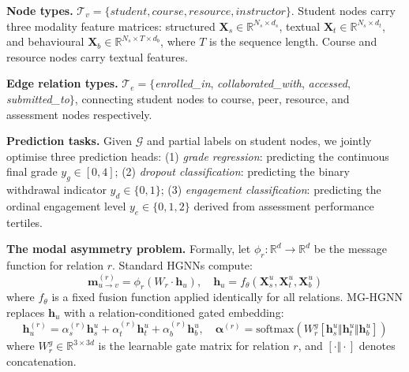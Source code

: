 \documentclass[sigconf]{acmart}
\begin{document}
\textbf{Node types.}
$\mathcal{T}_v = \{\textit{student}, \textit{course},
\textit{resource}, \textit{instructor}\}$.
Student nodes carry three modality feature matrices:
structured $\mathbf{X}_s \in \mathbb{R}^{N_s \times d_s}$,
textual $\mathbf{X}_t \in \mathbb{R}^{N_s \times d_t}$,
and behavioural $\mathbf{X}_b \in \mathbb{R}^{N_s
\times T \times d_b}$, where $T$ is the sequence
length. Course and resource nodes carry textual features.

\textbf{Edge relation types.}
$\mathcal{T}_e = \{$\textit{enrolled\_in},
\textit{collaborated\_with}, \textit{accessed},
\textit{submitted\_to}$\}$, connecting student nodes
to course, peer, resource, and assessment nodes
respectively.

\textbf{Prediction tasks.}
Given $\mathcal{G}$ and partial labels on student
nodes, we jointly optimise three prediction heads:
(1) \textit{grade regression}: predicting the
continuous final grade $y_g \in [0, 4]$;
(2) \textit{dropout classification}: predicting the
binary withdrawal indicator $y_d \in \{0, 1\}$;
(3) \textit{engagement classification}: predicting
the ordinal engagement level $y_e \in \{0, 1, 2\}$
derived from assessment performance tertiles.

\textbf{The modal asymmetry problem.}
Formally, let $\phi_r : \mathbb{R}^d \to \mathbb{R}^d$
be the message function for relation $r$. Standard
HGNNs compute:
\begin{equation}
  \mathbf{m}_{u \to v}^{(r)} = \phi_r\!\left(
  W_r \cdot \mathbf{h}_u \right),
  \quad \mathbf{h}_u = f_\theta(\mathbf{X}_s^u,
  \mathbf{X}_t^u, \mathbf{X}_b^u)
  \label{eq:standard}
\end{equation}
where $f_\theta$ is a fixed fusion function applied
identically for all relations. MG-HGNN replaces
$\mathbf{h}_u$ with a relation-conditioned gated
embedding:
\begin{equation}
  \mathbf{h}_u^{(r)} = \alpha_s^{(r)} \mathbf{h}_s^u
  + \alpha_t^{(r)} \mathbf{h}_t^u
  + \alpha_b^{(r)} \mathbf{h}_b^u,
  \quad \boldsymbol{\alpha}^{(r)} =
  \text{softmax}\!\left(W_r^g [\mathbf{h}_s^u
  \Vert \mathbf{h}_t^u \Vert \mathbf{h}_b^u]\right)
  \label{eq:gate}
\end{equation}
where $W_r^g \in \mathbb{R}^{3 \times 3d}$ is the
learnable gate matrix for relation $r$, and
$[\cdot \Vert \cdot]$ denotes concatenation.
\end{document}
